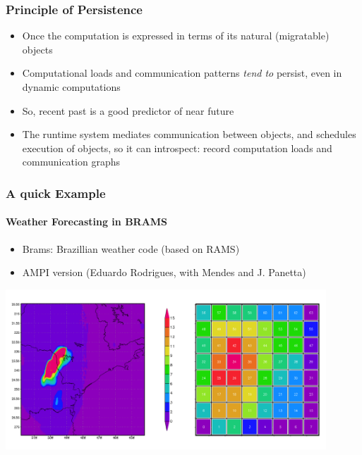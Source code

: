 \begin{frame}[fragile]
\frametitle{Principle of Persistence}
\begin{itemize}
 \item Once the computation is expressed in terms of its natural (migratable)
   objects
 \item Computational loads and communication patterns \emph{tend to} persist,
   even in dynamic computations
 \item So, recent past is a good predictor of near future
 \item The runtime system mediates communication between objects, and schedules
   execution of objects, so it can introspect: record computation loads and
   communication graphs
\end{itemize}
\end{frame}


\begin{frame}[fragile]
\frametitle{A quick Example}
\framesubtitle{Weather Forecasting in BRAMS}
\begin{itemize}
 \item Brams: Brazillian weather code (based on RAMS)
 \item AMPI version (Eduardo Rodrigues, with Mendes and J. Panetta)
\end{itemize}
\includegraphics[width=0.9\textwidth]{figures/bramsVisual.png}
\end{frame}


